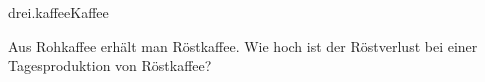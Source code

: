 \begin{exercise}{drei.kaffee}{Kaffee}
  \ifproblem\problem\par
    Aus  Rohkaffee erhält man  Röstkaffee. Wie hoch ist der
    Röstverlust bei einer Tagesproduktion von  Röstkaffee?
  \fi
\end{exercise}
